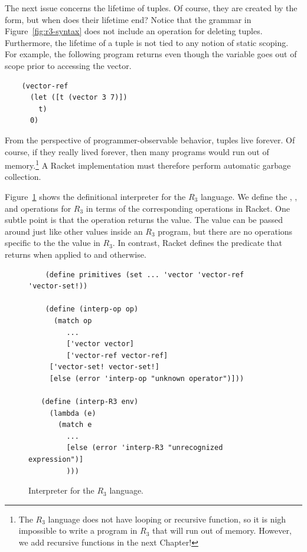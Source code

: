 \documentclass[11pt]{book}
\begin{document}
The next issue concerns the lifetime of tuples. Of course, they are
created by the  form, but when does their lifetime end?
Notice that the grammar in Figure~\ref{fig:r3-syntax} does not include
an operation for deleting tuples. Furthermore, the lifetime of a tuple
is not tied to any notion of static scoping. For example, the
following program returns  even though the variable 
goes out of scope prior to accessing the vector.
\begin{center}
\begin{minipage}{0.96\textwidth}
\begin{lstlisting}
    (vector-ref
      (let ([t (vector 3 7)])
        t)
      0)
\end{lstlisting}
\end{minipage}
\end{center}

From the perspective of programmer-observable behavior, tuples live
forever. Of course, if they really lived forever, then many programs
would run out of memory.\footnote{The $R_3$ language does not have
  looping or recursive function, so it is nigh impossible to write a
  program in $R_3$ that will run out of memory. However, we add
  recursive functions in the next Chapter!} A Racket implementation
must therefore perform automatic garbage collection.

Figure~\ref{fig:interp-R3} shows the definitional interpreter for the
$R_3$ language. We define the , , and
 operations for $R_3$ in terms of the corresponding
operations in Racket. One subtle point is that the 
operation returns the  value. The  value
can be passed around just like other values inside an $R_3$ program,
but there are no operations specific to the the  value
in $R_3$. In contrast, Racket defines the  predicate that
returns  when applied to  and 
otherwise.

\begin{figure}[tbp]
\begin{lstlisting}
    (define primitives (set ... 'vector 'vector-ref 'vector-set!))

    (define (interp-op op)
      (match op
         ...
         ['vector vector]
         ['vector-ref vector-ref]
	 ['vector-set! vector-set!]
	 [else (error 'interp-op "unknown operator")]))

   (define (interp-R3 env)
     (lambda (e)
       (match e
         ...
         [else (error 'interp-R3 "unrecognized expression")]
         )))
\end{lstlisting}
\caption{Interpreter for the $R_3$ language.}
\label{fig:interp-R3}
\end{figure}
\end{document}
